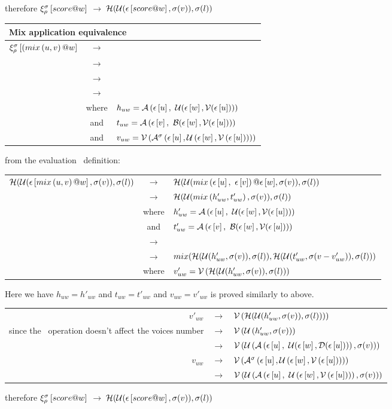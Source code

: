 \documentclass[10pt,a4paper,frenchb]{article}
\makeatletter
\newcommand{\evaltable}[1][$\rightarrow$]	  {\begin{center} \begin{tabular*}{\linewidth}{rc@{ #1 }l}}
\newcommand{\evaltitle}[1]		{\multicolumn{3}{l}{#1} \\ \hline}
\newcommand{\evaltablend}  		{\end{tabular*}\end{center}}
\newcommand{\evalspace}	  		{\vspace{2mm}\\}
\newcommand{\ra}					{\ensuremath{\rightarrow}}
\makeatother
\begin{document}
therefore \hspace{1cm} $\xi_{\rho}^{\sigma}\left[score @ w\right]$ 	\ra $\: \mathcal H( \mathcal U (\epsilon\left[score @ w\right], \sigma(v)), \sigma(l))$

\evaltable[]
\evaltitle {Mix application equivalence}
 $\xi_{\rho}^{\sigma}\left[(mix\left(u, v\right) @ w\right]$ 
 	& \ra & \apply{\evalss{\mixOp{u}{v}}}{\evalss{w}} \\
	& \ra & \apply{\mixOp{\evalss{u}}{\evalss{v}}}{\evalss{w}} \\
	& \ra & \bapplyMix{\evalss{u}}{\evalss{v}}{\evalss{w}} \\

	& \ra & \mixOp{\equivalence{h_{uw}}}{\equivv{t_{uw}}{v-v_{uw}}} \\
	& where & 	$h_{uw}=\mathcal A\left(\epsilon\left[u\right],\ \mathcal U(\epsilon\left[w\right], \mathcal V(\epsilon\left[u\right]))\right)$ \\
	& and &		$t_{uw} = \mathcal A\left(\epsilon\left[v\right],\ \mathcal B(\epsilon\left[w\right], \mathcal V(\epsilon\left[u\right]))\right) $ \\
	& and & 		$v_{uw} = \mathcal V\left(\mathcal A^{\sigma}\left(\epsilon\left[u\right],\mathcal U\left(\epsilon\left[w\right], \mathcal V\left(\epsilon\left[u\right]\right)\right)\right)\right) $
\evaltablend

from the evaluation \evalsym\ definition:
\evaltable[]
 $\mathcal H( \mathcal U (\epsilon\left[mix\left(u, v\right) @ w\right], \sigma(v)), \sigma(l))$  
 	& \ra & $\mathcal H( \mathcal U (mix\left(\epsilon\left[u\right], \ \epsilon\left[v\right]\right) @ {\epsilon\left[w\right]}, \sigma(v)), \sigma(l))$\\
 	& \ra & $\mathcal H( \mathcal U (mix\left(h'_{uw}, t'_{uw}\right), \sigma(v)), \sigma(l))$\\
	& where &	$h'_{uw}=\mathcal A\left(\epsilon\left[u\right],\ \mathcal U(\epsilon\left[w\right],\mathcal V(\epsilon\left[u\right]))\right)$ \\
	& and &		$t'_{uw} = \mathcal A\left(\epsilon\left[v\right],\ \mathcal B(\epsilon\left[w\right], \mathcal V(\epsilon\left[u\right]))\right) $ \\
	& \ra & \headOp{\topMix{h'_{uw}}{t'_{uw}}{\bounds(v)}}{\bounds(l)} \\
	& \ra & $mix(\mathcal H( \mathcal U (h'_{uw}, \sigma(v)), \sigma(l)), \mathcal H( \mathcal U (t'_{uw}, \sigma(v-v'_{uw})), \sigma(l)))$ \\
	& where &	$v'_{uw}= \mathcal V\left(\mathcal H( \mathcal U (h'_{uw}, \sigma(v)), \sigma(l))\right)$ 
\evaltablend




Here we have $h_{uw} = h'_{uw}$ and $t_{uw} = t'_{uw}$ and $v_{uw} = v'_{uw}$ is proved similarly to above.
\evaltable[]
$v'_{uw}$  
 	& \ra & $\mathcal V\left(\mathcal H( \mathcal U (h'_{uw}, \sigma(v)), \sigma(l))\right))$ \\
since the \head\ operation doesn't affect the voices number \voices
 	& \ra & $\mathcal V\left(\mathcal U\left(h'_{uw}, \sigma(v)\right)\right)$  \\
 	& \ra & $\mathcal V\left(\mathcal U\left(\mathcal A\left(\epsilon\left[u\right],\ \mathcal U(\epsilon\left[w\right],\mathcal D(\epsilon\left[u\right]))\right), \sigma(v)\right)\right)$
\evalspace
 $v_{uw}$  
 	& \ra & $\mathcal V\left(\mathcal A^{\sigma}\left(\epsilon\left[u\right],\mathcal U\left(\epsilon\left[w\right], \mathcal V\left(\epsilon\left[u\right]\right)\right)\right)\right)$ \\
  	& \ra & $\mathcal V\left(\mathcal U\left(\mathcal A\left(\epsilon\left[u\right],\ \mathcal U\left(\epsilon\left[w\right], \mathcal V\left(\epsilon\left[u\right]\right)\right)\right), \sigma(v)\right)\right)$ \\
\evaltablend

therefore \hspace{1cm} $\xi_{\rho}^{\sigma}\left[score @ w\right]$ 	\ra $\: \mathcal H( \mathcal U (\epsilon\left[score @ w\right], \sigma(v)), \sigma(l))$
\end{document}
